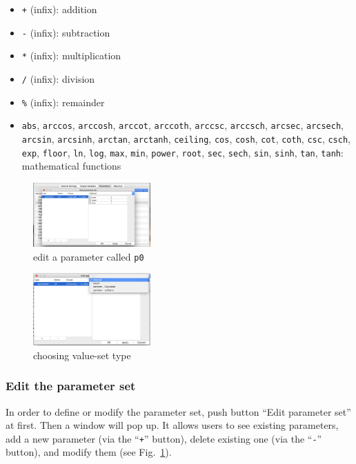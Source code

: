 \documentclass[a4paper,10pt]{report}
\begin{document}
\begin{itemize}
\item \texttt{+} (infix): addition
\item \texttt{-} (infix): subtraction
\item \texttt{*} (infix): multiplication
\item \texttt{/} (infix): division
\item \texttt{\%} (infix): remainder
\item \texttt{abs},
\texttt{arccos},
\texttt{arccosh},
\texttt{arccot},
\texttt{arccoth},
\texttt{arccsc},
\texttt{arccsch},
\texttt{arcsec},
\texttt{arcsech},
\texttt{arcsin},
\texttt{arcsinh},
\texttt{arctan},
\texttt{arctanh},
\texttt{ceiling},
\texttt{cos},
\texttt{cosh},
\texttt{cot},
\texttt{coth},
\texttt{csc},
\texttt{csch},
\texttt{exp},
\texttt{floor},
\texttt{ln},
\texttt{log},
\texttt{max},
\texttt{min},
\texttt{power},
\texttt{root},
\texttt{sec},
\texttt{sech},
\texttt{sin},
\texttt{sinh},
\texttt{tan},
\texttt{tanh}: mathematical functions
\end{itemize}

\begin{figure}[htbp]
\centering
\includegraphics[width=0.4\textwidth]{image/lr-edit-parameter-set-a.png}
\caption{\label{fig:orgcf387ee}edit a parameter called \texttt{p0}}
\end{figure}
\begin{figure}[htbp]
\centering
\includegraphics[width=0.4\textwidth]{image/lr-edit-parameter-set-b.png}
\caption{\label{fig:org1e3ee88}choosing value-set type}
\end{figure}

\subsubsection{Edit the parameter set}
\label{sec:org7e9ce6a}
In order to define or modify the parameter set, push button ``Edit parameter
set'' at first. Then a window will pop up. It allows users to see existing
parameters, add a new parameter (via the ``\texttt{+}'' button), delete existing
one (via the ``\texttt{-}'' button), and modify them (see
Fig.~\ref{fig:orgcf387ee}).
\end{document}
